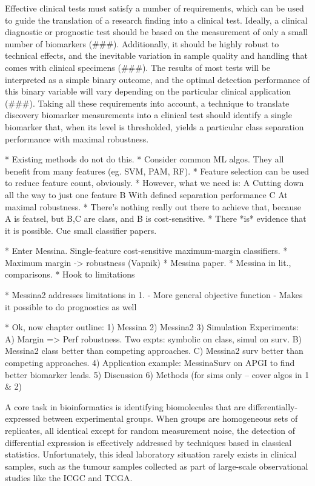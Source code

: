 \documentclass[dissertation.tex]{subfiles}
\begin{document}
Effective clinical tests must satisfy a number of requirements, which can be used to guide the translation of a research finding into a clinical test.  Ideally, a clinical diagnostic or prognostic test should be based on the measurement of only a small number of biomarkers (###).  Additionally, it should be highly robust to technical effects, and the inevitable variation in sample quality and handling that comes with clinical specimens (###).  The results of most tests will be interpreted as a simple binary outcome, and the optimal detection performance of this binary variable will vary depending on the particular clinical application (###).  Taking all these requirements into account, a technique to translate discovery biomarker measurements into a clinical test should identify a single biomarker that, when its level is thresholded, yields a particular class separation performance with maximal robustness.

* Existing methods do not do this.
* Consider common ML algos.  They all benefit from many features (eg. SVM, PAM, RF).
* Feature selection can be used to reduce feature count, obviously.
* However, what we need is:
  A Cutting down all the way to just one feature
  B With defined separation performance
  C At maximal robustness.
* There's nothing really out there to achieve that, because A is featsel, but B,C are class, and B is cost-sensitive.
* There *is* evidence that it is possible.  Cue small classifier papers.

* Enter Messina.  Single-feature cost-sensitive maximum-margin classifiers.
* Maximum margin -> robustness (Vapnik)
* Messina paper.
* Messina in lit., comparisons.
* Hook to limitations

* Messina2 addresses limitations in 1.
  - More general objective function
  - Makes it possible to do prognostics as well

* Ok, now chapter outline:
  1) Messina
  2) Messina2
  3) Simulation Experiments:
     A) Margin => Perf robustness.  Two expts: symbolic on class, simul on surv.
     B) Messina2 class better than competing approaches.
     C) Messina2 surv better than competing approaches.
  4) Application example: MessinaSurv on APGI to find better biomarker leads.
  5) Discussion
  6) Methods (for sims only -- cover algos in 1 & 2)


A core task in bioinformatics is identifying biomolecules that are differentially-expressed between experimental groups. When groups are homogeneous sets of replicates, all identical except for random measurement noise, the detection of differential expression is effectively addressed by techniques based in classical statistics.  Unfortunately, this ideal laboratory situation rarely exists in clinical samples, such as the tumour samples collected as part of large-scale observational studies like the ICGC and TCGA.
\end{document}
